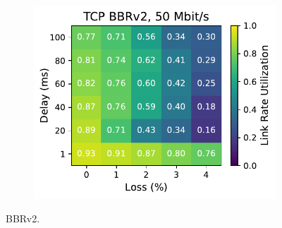 \begin{figure}[ht]
\begin{subfigure}[b]{1cm}
        \includegraphics[width=\linewidth,trim={8cm 0 0 0},clip]{figures/heatmaps/heatmap_tcp_bbr2_50mbps.pdf}
        \vspace*{0.01cm}
    \end{subfigure}
    \caption{BBRv2.}
\end{figure}

